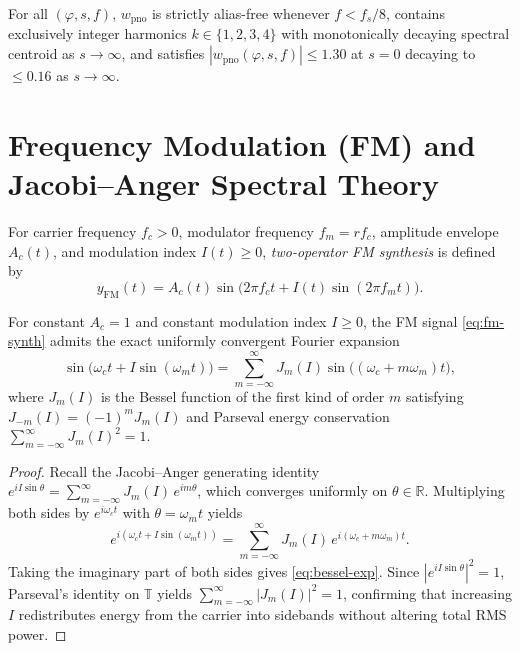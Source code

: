 \begin{proposition}
For all $(\varphi, s, f)$, $w_{\mathrm{pno}}$ is strictly alias-free whenever $f < f_s / 8$, contains exclusively integer harmonics $k \in \{1, 2, 3, 4\}$ with monotonically decaying spectral centroid as $s \to \infty$, and satisfies $|w_{\mathrm{pno}}(\varphi, s, f)| \le 1.30$ at $s = 0$ decaying to $\le 0.16$ as $s \to \infty$.
\end{proposition}

\section{Frequency Modulation (FM) and Jacobi--Anger Spectral Theory}

\begin{definition}
For carrier frequency $f_c > 0$, modulator frequency $f_m = r f_c$, amplitude envelope $A_c(t)$, and modulation index $I(t) \ge 0$, \emph{two-operator FM synthesis} is defined by
\begin{equation}
\label{eq:fm-synth}
y_{\mathrm{FM}}(t) = A_c(t)\sin\!\Big(2\pi f_c t + I(t)\sin(2\pi f_m t)\Big).
\end{equation}
\end{definition}

\begin{theorem}
\label{thm:jacobi-anger}
For constant $A_c = 1$ and constant modulation index $I \ge 0$, the FM signal \eqref{eq:fm-synth} admits the exact uniformly convergent Fourier expansion
\begin{equation}
\label{eq:bessel-exp}
\sin\!\big(\omega_c t + I\sin(\omega_m t)\big) = \sum_{m=-\infty}^{\infty} J_m(I)\sin\!\big((\omega_c + m\omega_m)t\big),
\end{equation}
where $J_m(I)$ is the Bessel function of the first kind of order $m$ satisfying $J_{-m}(I) = (-1)^m J_m(I)$ and Parseval energy conservation $\sum_{m=-\infty}^{\infty} J_m(I)^2 = 1$.
\end{theorem}

\begin{proof}
Recall the Jacobi--Anger generating identity $e^{i I \sin\theta} = \sum_{m=-\infty}^{\infty} J_m(I)\,e^{i m\theta}$, which converges uniformly on $\theta \in \mathbb{R}$. Multiplying both sides by $e^{i\omega_c t}$ with $\theta = \omega_m t$ yields
\[
e^{i(\omega_c t + I\sin(\omega_m t))} = \sum_{m=-\infty}^{\infty} J_m(I)\,e^{i(\omega_c + m\omega_m)t}.
\]
Taking the imaginary part of both sides gives \eqref{eq:bessel-exp}. Since $|e^{i I \sin\theta}|^2 = 1$, Parseval's identity on $\mathbb{T}$ yields $\sum_{m=-\infty}^{\infty} |J_m(I)|^2 = 1$, confirming that increasing $I$ redistributes energy from the carrier into sidebands without altering total RMS power.
\end{proof}

